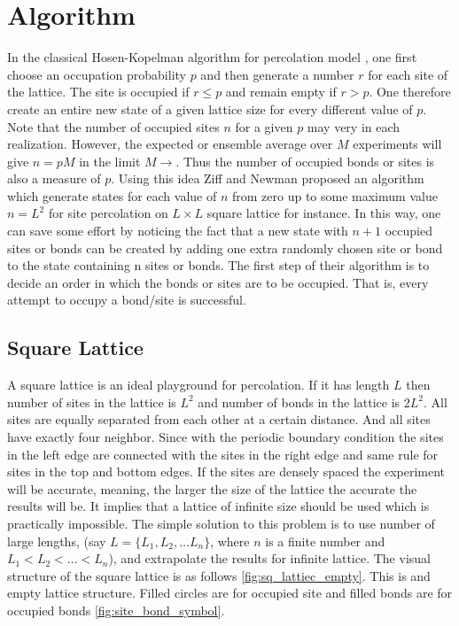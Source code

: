 \section{Algorithm} \label{sect:algorithm}
	In the classical Hosen-Kopelman algorithm for percolation model \cite{Hoshen1976}, one first choose an occupation probability $p$ and then generate a number $r$ for each site of the lattice. The site is occupied if $r \leq p$ and remain empty if $r > p$. One therefore create an entire new state of a given lattice size for every different value of $p$. Note that the number of occupied sites $n$ for a given $p$ may very in each realization. However, the expected or ensemble average over $M$ experiments will give $n = p M$ in the limit $M \rightarrow$. Thus the number of occupied bonds or sites is also a measure of $p$. Using this idea Ziff and Newman \cite{Newman2001} proposed an algorithm which generate states for each value of $n$ from zero up to some maximum value $n = L^2$ for site percolation on $L\times L$ square lattice for instance. In this way, one can save some effort by noticing the fact that a new state with $n + 1$ occupied sites or bonds can be created by adding one extra randomly chosen site or bond to the state containing n sites or bonds. The first step of their algorithm is to decide an order in which the bonds or sites are to be occupied. That is, every attempt to occupy a bond/site is successful.
	
	\subsection{Square Lattice}
	A square lattice is an ideal playground for percolation. If it has length $L$ then number of sites in the lattice is $L^2$ and number of bonds in the lattice is $2 L^2$. All sites are equally separated from each other at a certain distance. And all sites have exactly four neighbor. Since with the periodic boundary condition the sites in the left edge are connected with the sites in the right edge and same rule for sites in the top and bottom edges. If the sites are densely spaced the experiment will be accurate, meaning, the larger the size of the lattice the accurate the results will be. It implies that a lattice of infinite size should be used which is practically impossible. The simple solution to this problem is to use number of large lengths, (say $L = \{L_1, L_2, \ldots L_n \}$, where $n$ is a finite number and $L_1 < L_2 < \ldots < L_n$), and extrapolate the results for infinite lattice. The visual structure of the square lattice is as follows \ref{fig:sq_lattiec_empty}. This is and empty lattice structure. Filled circles are for occupied site and filled bonds are for occupied bonds \ref{fig:site_bond_symbol}.
	
